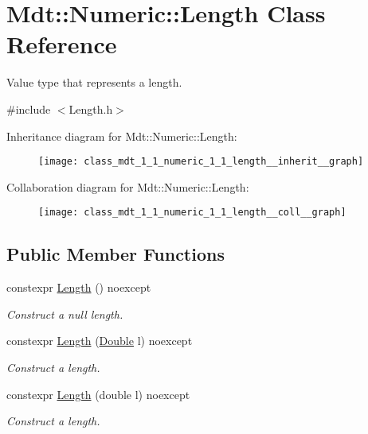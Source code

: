 \hypertarget{class_mdt_1_1_numeric_1_1_length}{}\section{Mdt\+:\+:Numeric\+:\+:Length Class Reference}
\label{class_mdt_1_1_numeric_1_1_length}


Value type that represents a length.  




{\ttfamily \#include $<$Length.\+h$>$}



Inheritance diagram for Mdt\+:\+:Numeric\+:\+:Length\+:\nopagebreak
\begin{figure}[H]
\begin{center}
\leavevmode
\texttt{[image: class\_mdt\_1\_1\_numeric\_1\_1\_length\_\_inherit\_\_graph]}
\end{center}
\end{figure}


Collaboration diagram for Mdt\+:\+:Numeric\+:\+:Length\+:\nopagebreak
\begin{figure}[H]
\begin{center}
\leavevmode
\texttt{[image: class\_mdt\_1\_1\_numeric\_1\_1\_length\_\_coll\_\_graph]}
\end{center}
\end{figure}
\subsection*{Public Member Functions}
\begin{DoxyCompactItemize}
\item 
constexpr \hyperlink{class_mdt_1_1_numeric_1_1_length_a7ad7b263b98b280ba6d383edc260d2a5}{Length} () noexcept
\begin{DoxyCompactList}\small\item\em Construct a null length. \end{DoxyCompactList}\item 
constexpr \hyperlink{class_mdt_1_1_numeric_1_1_length_a7d7b7aa5f63272a62870dbe782af0adb}{Length} (\hyperlink{class_mdt_1_1_numeric_1_1_double}{Double} l) noexcept
\begin{DoxyCompactList}\small\item\em Construct a length. \end{DoxyCompactList}\item 
constexpr \hyperlink{class_mdt_1_1_numeric_1_1_length_abc975577596b9b57d134ef814ff6a0e4}{Length} (double l) noexcept
\begin{DoxyCompactList}\small\item\em Construct a length. \end{DoxyCompactList}\end{DoxyCompactItemize}
